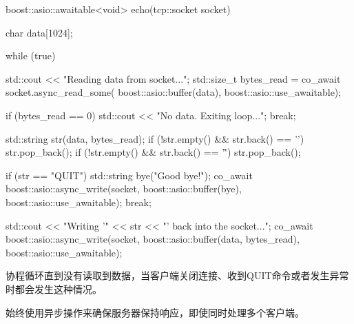 \begin{cpp}
boost::asio::awaitable<void> echo(tcp::socket socket) {
    char data[1024];

    while (true) {
        std::cout << "Reading data from socket...\n";
        std::size_t bytes_read = co_await
                 socket.async_read_some(
                        boost::asio::buffer(data),
                        boost::asio::use_awaitable);

        if (bytes_read == 0) {
            std::cout << "No data. Exiting loop...\n";
            break;
        }

        std::string str(data, bytes_read);
        if (!str.empty() && str.back() == '\n') {
            str.pop_back();
        }
        if (!str.empty() && str.back() == '\r') {
            str.pop_back();
        }

        if (str == "QUIT") {
            std::string bye("Good bye!\n");
            co_await boost::asio::async_write(socket,
                        boost::asio::buffer(bye),
                        boost::asio::use_awaitable);
            break;
        }

        std::cout << "Writing '" << str
                  << "' back into the socket...\n";
        co_await boost::asio::async_write(socket,
                    boost::asio::buffer(data,
                                        bytes_read),
                    boost::asio::use_awaitable);
    }
}
\end{cpp}

协程循环直到没有读取到数据，当客户端关闭连接、收到QUIT命令或者发生异常时都会发生这种情况。

始终使用异步操作来确保服务器保持响应，即使同时处理多个客户端。


